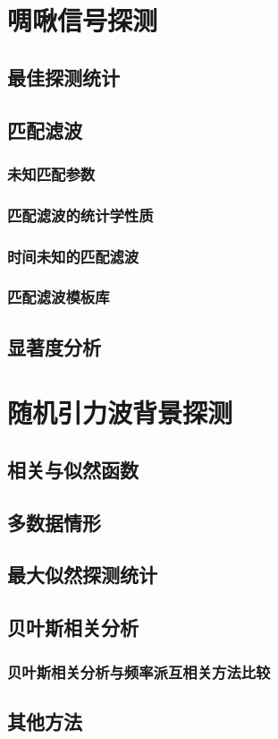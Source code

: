 \section{啁啾信号探测}
\subsection{最佳探测统计}
\subsection{匹配滤波}
\subsubsection{未知匹配参数}
\subsubsection{匹配滤波的统计学性质}
\subsubsection{时间未知的匹配滤波}
\subsubsection{匹配滤波模板库}
\subsection{显著度分析}

\section{随机引力波背景探测}
\subsection{相关与似然函数}
\subsection{多数据情形}
\subsection{最大似然探测统计}
\subsection{贝叶斯相关分析}
\subsubsection{贝叶斯相关分析与频率派互相关方法比较}
\subsection{其他方法}
